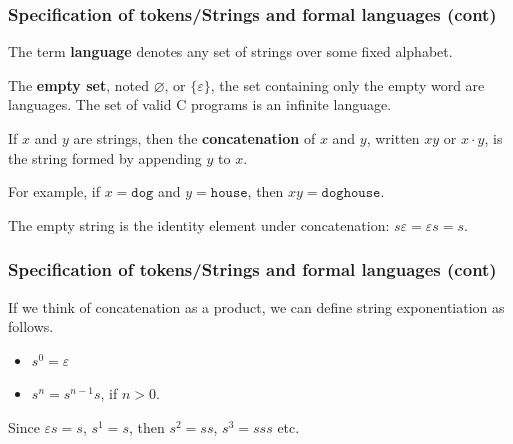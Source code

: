 %
\begin{frame}
\frametitle{Specification of tokens/Strings and formal languages (cont)}

The term \textbf{language} denotes any set of strings over some fixed
alphabet.

\bigskip

The \textbf{empty set}, noted \(\varnothing\), or \(\{\varepsilon\}\),
the set containing only the empty word are languages. The set of valid
C programs is an infinite language.

\bigskip

If \(x\) and \(y\) are strings, then the \textbf{concatenation}
of \(x\) and \(y\), written \(xy\) or \(x \cdot y\), is the string
formed by appending \(y\) to \(x\).

\bigskip

For example, if \(x = \texttt{dog}\) and \(y = \texttt{house}\),
then \(xy = \texttt{doghouse}\).

\bigskip

The empty string is the identity element under
concatenation: \(s \varepsilon = \varepsilon s = s\).

\end{frame}

%
\begin{frame}
\frametitle{Specification of tokens/Strings and formal languages (cont)}

If we think of concatenation as a product, we can define string
exponentiation as follows.
\begin{itemize}

  \item \(s^0 = \varepsilon\)

  \item \(s^{n} = s^{n-1} s\), if \(n > 0\).

\end{itemize}
Since \(\varepsilon s = s\), \(s^1 = s\), then \(s^2 = ss\), \(s^3 =
sss\) etc.

\end{frame}

